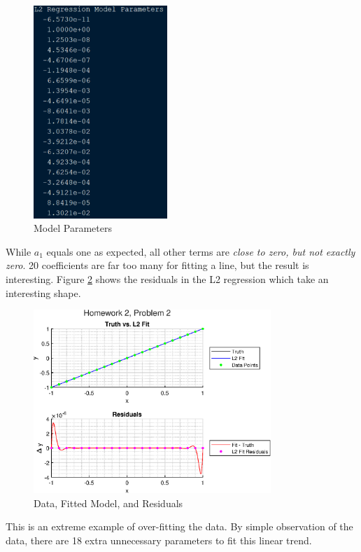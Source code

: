 \begin{figure}[h] 
	\centering
	\includegraphics[width=0.45\textwidth]{./images/prob2_model_params.png}
	\caption{Model Parameters}
	\label{fig: prob2 model params}
\end{figure}
\FloatBarrier

While $a_1$ equals one as expected, all other terms are \textit{close to zero, but not exactly zero}. 20 coefficients are far too many for fitting a line, but the result is interesting. Figure \ref{fig: prob2 residuals} shows the residuals in the L2 regression which take an interesting shape.

\begin{figure}[h] 
	\centering
	\includegraphics[width=0.8\textwidth]{./images/prob2_1.eps}
	\caption{Data, Fitted Model, and Residuals}
	\label{fig: prob2 residuals}
\end{figure}
\FloatBarrier

This is an extreme example of over-fitting the data. By simple observation of the data, there are 18 extra unnecessary parameters to fit this linear trend. 

